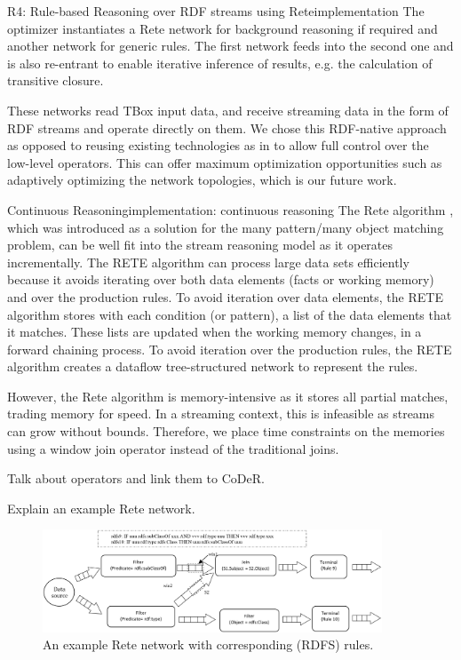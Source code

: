 \begin{nestedsection}{R4: Rule-based Reasoning over RDF streams using Rete}{implementation}
	The optimizer instantiates a Rete network for background reasoning if required and another network for generic rules.
	The first network feeds into the second one and is also re-entrant to enable iterative inference of results, e.g. the calculation of transitive closure.
	
	These networks read TBox input data, and receive streaming data in the form of RDF streams and operate directly on them.
	We chose this RDF-native approach as opposed to reusing existing technologies as in \citep{C-SPARQL,streaming-sparql} to allow full control over the low-level operators.
	This can offer maximum optimization opportunities such as adaptively optimizing the network topologies, which is our future work.

	\begin{nestedsection}{Continuous Reasoning}{implementation: continuous reasoning}
		The Rete algorithm \citep{forgy79}, which was introduced as a solution for the many pattern/many object matching problem, can be well fit into the stream reasoning model as it operates incrementally.
		The RETE algorithm can process large data sets efficiently because it avoids iterating over both data elements (facts or working memory) and over the production rules.
		To avoid iteration over data elements, the RETE algorithm stores with each condition (or pattern), a list of the data elements that it matches.
		These lists are updated when the working memory changes, in a forward chaining process.
		To avoid iteration over the production rules, the RETE algorithm creates a dataflow tree-structured network to represent the rules.
		
		However, the Rete algorithm is memory-intensive as it stores all partial matches, trading memory for speed.
		In a streaming context, this is infeasible as streams can grow without bounds.
		Therefore, we place time constraints on the memories using a window join operator instead of the traditional joins.

		Talk about operators and link them to CoDeR.

 		Explain an example Rete network.

 		\begin{figure}[t]
 			\centering
 			\includegraphics[width=0.9\textwidth]{example-rete-network}
 			\caption{An example Rete network with corresponding (RDFS) rules.}
 		\end{figure}
	\end{nestedsection}
\end{nestedsection}
